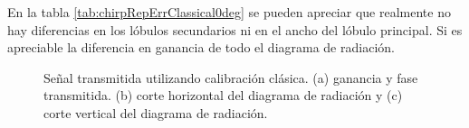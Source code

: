 En la tabla \ref{tab:chirpRepErrClassical0deg} se pueden apreciar que realmente no hay diferencias en los lóbulos secundarios 
ni en el ancho del lóbulo principal. Si es apreciable la diferencia en ganancia de todo el diagrama de radiación.

\begin{figure}[H]
	\centering

	\caption{Señal transmitida utilizando calibración clásica. (a) ganancia y fase transmitida. (b) corte horizontal del 
	diagrama de radiación y (c) corte vertical del diagrama de radiación.}
	\label{fig:chirpRepErrClassical0deg}
\end{figure}

